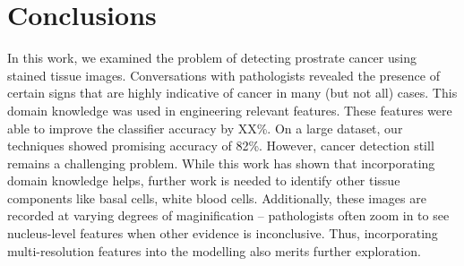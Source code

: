 \section{Conclusions}
\label{sec:conclusions}

In this work, we examined the problem of detecting prostrate cancer using stained tissue images. Conversations with pathologists revealed the presence of certain signs that are highly indicative of cancer in many (but not all) cases. This domain knowledge was used in engineering relevant features. These features were able to improve the classifier accuracy by XX\%. On a large dataset, our techniques showed promising accuracy of 82\%. However, cancer detection still remains a challenging problem. While this work has shown that incorporating domain knowledge helps, further work is needed to identify other tissue components like basal cells, white blood cells. Additionally, these images are recorded at varying degrees of maginification -- pathologists often zoom in to see nucleus-level features when other evidence is inconclusive. Thus, incorporating multi-resolution features into the modelling also merits further exploration. 